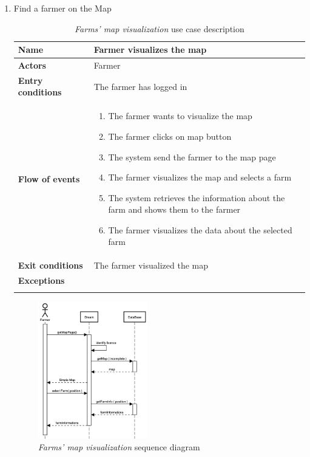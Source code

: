 \begin{enumerate}
    \item Find a farmer on the Map\\
    \begin{longtable}{p{0.26\linewidth}p{0.75\linewidth}}
        \toprule
        \textbf{Name} & \textbf{Farmer visualizes the map} \\
        \midrule
        \textbf{Actors} & Farmer \\
        \midrule
        \textbf{Entry conditions} & The farmer has logged in\\
        \midrule
        \textbf{Flow of events} & 
        \begin{enumerate}
            \item The farmer wants to visualize the map
            \item The farmer clicks on map button
            \item The system send the farmer to the map page
            \item The farmer visualizes the map and selects a farm
            \item The system retrieves the information about the farm and shows them to the farmer
            \item The farmer visualizes the data about the selected farm
        \end{enumerate} \\
        \midrule
        \textbf{Exit conditions} & The farmer visualized the map\\
        \midrule
        \textbf{Exceptions} & \\
        \bottomrule
        \caption{\emph{Farms' map visualization} use case description}
    \end{longtable}
    \begin{figure}[H]
        \begin{center}
        \includegraphics[width=0.45\textwidth]{sequence/VisializeMap.png}
        \caption{\emph{Farms' map visualization} sequence diagram}
        \label{fig:sequence4}
        \end{center}
    \end{figure}
    

\end{enumerate}
